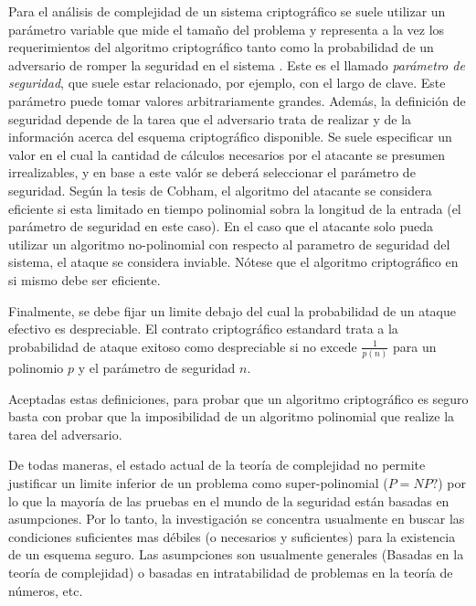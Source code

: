 Para el análisis de complejidad de un sistema criptográfico se suele utilizar un parámetro variable que mide el tamaño del problema y representa a la vez los requerimientos del algoritmo criptográfico tanto como la probabilidad de un adversario de romper la seguridad en el sistema \cite{iashchenko2002cryptography}. Este es el llamado \textit{parámetro de seguridad}, que suele estar relacionado, por ejemplo, con el largo de clave.
Este parámetro puede tomar valores arbitrariamente grandes.
Además, la definición de seguridad depende de la tarea que el adversario trata de realizar y de la información acerca del esquema criptográfico disponible.
Se suele especificar un valor en el cual la cantidad de cálculos necesarios por el atacante se presumen irrealizables, y en base a este valór se deberá seleccionar el parámetro de seguridad.
Según la tesis de Cobham\cite{citeulike:6647003}, el algoritmo del atacante se considera eficiente si esta limitado en tiempo polinomial sobra la longitud de la entrada (el parámetro de seguridad en este caso). En el caso que el atacante solo pueda utilizar un algoritmo no-polinomial con respecto al parametro de seguridad del sistema, el ataque se considera inviable. Nótese que el algoritmo criptográfico en si mismo debe ser eficiente.

Finalmente, se debe fijar un limite debajo del cual la probabilidad de un ataque efectivo es despreciable. El contrato criptográfico estandard trata a la probabilidad de ataque exitoso como despreciable si no excede $\frac{1}{p(n)}$  para un polinomio $p$ y el parámetro de seguridad $n$\cite{iashchenko2002cryptography}.

Aceptadas estas definiciones, para probar que un algoritmo criptográfico es seguro basta con probar que la imposibilidad de un algoritmo polinomial que realize la tarea del adversario.

De todas maneras, el estado actual de la teoría de complejidad no permite justificar un limite inferior de un problema como super-polinomial ($P=NP?$) por lo que la mayoría de las pruebas en el mundo de la seguridad están basadas en asumpciones.
Por lo tanto, la investigación se concentra usualmente en buscar las condiciones suficientes mas débiles (o necesarios y suficientes) para la existencia de un esquema seguro.
Las asumpciones son usualmente generales (Basadas en la teoría de complejidad) o basadas en intratabilidad de problemas en la teoría de números, etc.

